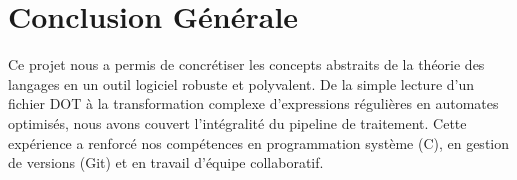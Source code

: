 \documentclass[12pt,a4paper]{article}
\begin{document}
\section{Conclusion Générale}
Ce projet nous a permis de concrétiser les concepts abstraits de la théorie des langages en un outil logiciel robuste et polyvalent. De la simple lecture d'un fichier DOT à la transformation complexe d'expressions régulières en automates optimisés, nous avons couvert l'intégralité du pipeline de traitement. Cette expérience a renforcé nos compétences en programmation système (C), en gestion de versions (Git) et en travail d'équipe collaboratif.
\end{document}
